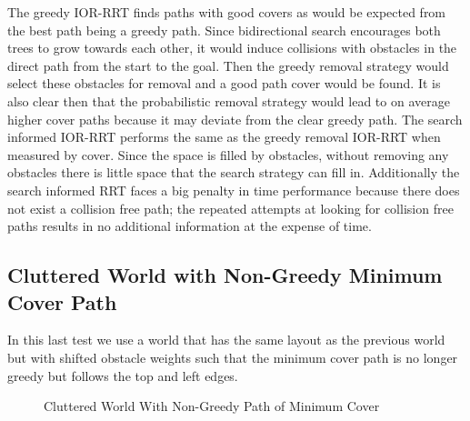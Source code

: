 The greedy IOR-RRT finds paths with good covers as would be expected from the best path being a greedy path. Since bidirectional search encourages both trees to grow towards each other, it would induce collisions with obstacles in the direct path from the start to the goal. Then the greedy removal strategy would select these obstacles for removal and a good path cover would be found. It is also clear then that the probabilistic removal strategy would lead to on average higher cover paths because it may deviate from the clear greedy path. The search informed IOR-RRT performs the same as the greedy removal IOR-RRT when measured by cover. Since the space is filled by obstacles, without removing any obstacles there is little space that the search strategy can fill in. Additionally the search informed RRT faces a big penalty in time performance because there does not exist a collision free path; the repeated attempts at looking for collision free paths results in no additional information at the expense of time.


\subsection{Cluttered World with Non-Greedy Minimum Cover Path}
In this last test we use a world that has the same layout as the previous world but with shifted obstacle weights such that the minimum cover path is no longer greedy but follows the top and left edges. 


\begin{figure}[!h]
    \hfill
    \caption{Cluttered World With Non-Greedy Path of Minimum Cover}
    \label{fig:top_light_cluttered_world}
\end{figure}


